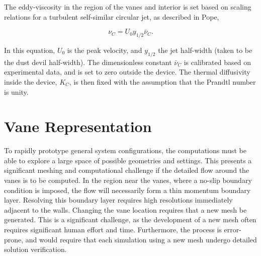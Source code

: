 
The eddy-viscosity in the region of the vanes and interior is set based
on scaling relations for a turbulent self-similar circular jet, as
described in Pope\cite{pope2000turbulent},
 
\begin{equation}
  \nu_C = U_0 y_{1/2} \bar \nu_C.
\end{equation}

In this equation, $U_0$ is the peak velocity, and $y_{1/2}$ the jet
half-width (taken to be the dust devil half-width).  
The dimensionless constant $\bar \nu_C $ is calibrated based on
experimental data, and is set to zero outside the device. 
The thermal diffusivity inside the device, $K_C$, is then fixed with the 
assumption that the Prandtl number is unity.  




\section{Vane Representation}
\label{subsec:vane}
To rapidly prototype general system configurations, the
computations must be able to explore a large space of possible
geometries and settings. This presents a significant meshing and 
computational challenge if the detailed flow around the vanes is to be
computed. In the region near the vanes, where a no-slip boundary
condition is imposed, the flow will necessarily form a thin momentum
boundary layer. Resolving this boundary layer requires high resolutions
immediately adjacent to the walls. Changing the vane location requires
that a new mesh be generated. This is a significant
challenge, as the development of a new mesh often requires significant
human effort and time. Furthermore, the process is error-prone, 
and would require that each simulation using a new mesh undergo 
detailed solution verification. 


